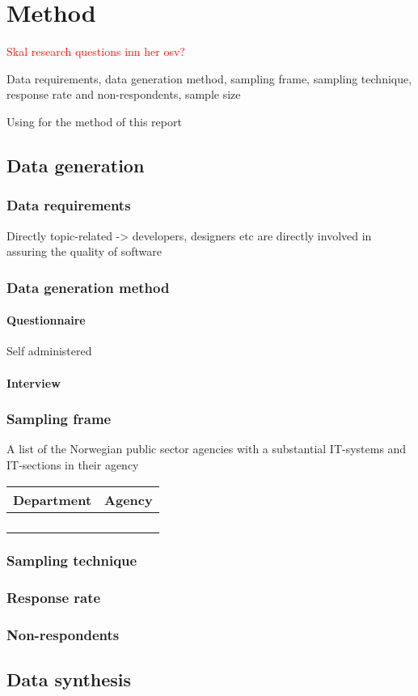 \chapter{Method}

\textcolor{red}{Skal research questions inn her osv?}

Data requirements, data generation method, sampling frame, sampling technique, response rate and non-respondents, sample size

Using \cite{bjo_2022} for the method of this report

\section{Data generation}

\subsection{Data requirements}
Directly topic-related -> developers, designers etc are directly involved in assuring the quality of software

\subsection{Data generation method}

\subsubsection{Questionnaire}
Self administered

\subsubsection{Interview}


\subsection{Sampling frame}
A list of the Norwegian public sector agencies with a substantial IT-systems and IT-sections in their agency

\begin{table}[H]
\begin{tabular}{ll}
\hline
Department & Agency \\ \hline
           &        \\
           &        \\
           &        \\
           &        \\ \hline
\end{tabular}%
\end{table}
\subsection{Sampling technique}

\subsection{Response rate}

\subsection{Non-respondents}


\section{Data synthesis}